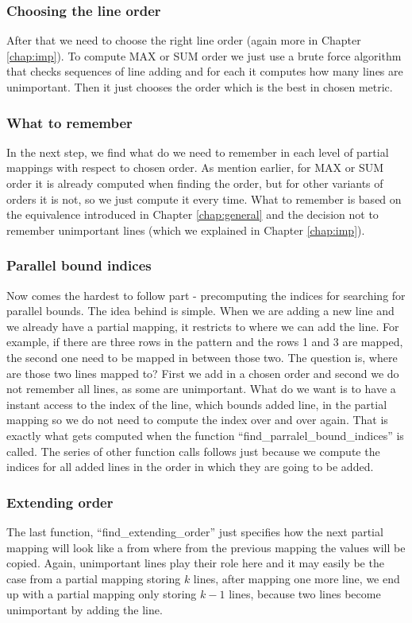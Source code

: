 \subsubsection{Choosing the line order}
After that we need to choose the right line order (again more in Chapter \ref{chap:imp}). To compute MAX or SUM order we just use a brute force algorithm that checks sequences of line adding and for each it computes how many lines are unimportant. Then it just chooses the order which is the best in chosen metric.

\subsubsection{What to remember}
In the next step, we find what do we need to remember in each level of partial mappings with respect to chosen order. As mention earlier, for MAX or SUM order it is already computed when finding the order, but for other variants of orders it is not, so we just compute it every time. What to remember is based on the equivalence introduced in Chapter \ref{chap:general} and the decision not to remember unimportant lines (which we explained in Chapter \ref{chap:imp}).

\subsubsection{Parallel bound indices}
Now comes the hardest to follow part - precomputing the indices for searching for parallel bounds. The idea behind is simple. When we are adding a new line and we already have a partial mapping, it restricts to where we can add the line. For example, if there are three rows in the pattern and the rows 1 and 3 are mapped, the second one need to be mapped in between those two. The question is, where are those two lines mapped to? First we add in a chosen order and second we do not remember all lines, as some are unimportant. What do we want is to have a instant access to the index of the line, which bounds added line, in the partial mapping so we do not need to compute the index over and over again. That is exactly what gets computed when the function ``find\_parralel\_bound\_indices'' is called. The series of other function calls follows just because we compute the indices for all added lines in the order in which they are going to be added.

\subsubsection{Extending order}
The last function, ``find\_extending\_order'' just specifies how the next partial mapping will look like a from where from the previous mapping the values will be copied. Again, unimportant lines play their role here and it may easily be the case from a partial mapping storing $k$ lines, after mapping one more line, we end up with a partial mapping only storing $k-1$ lines, because two lines become unimportant by adding the line.

